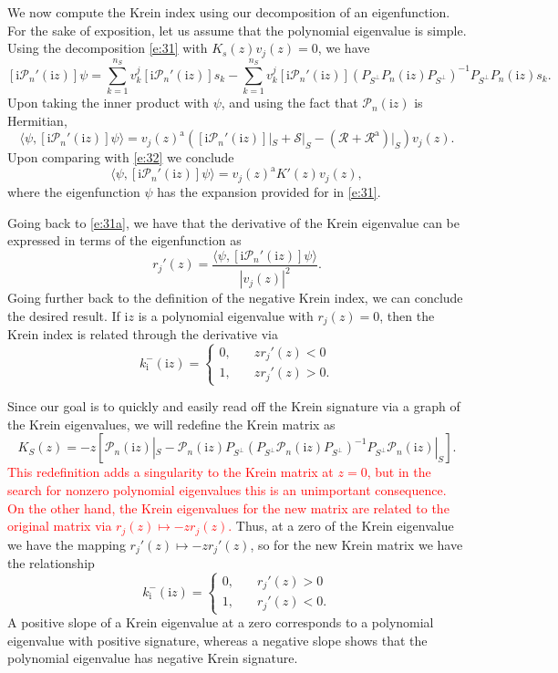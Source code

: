 \documentclass[review,onefignum,onetabnum]{siamart171218}
\newcommand{\rma}{\mathrm{a}}
\newcommand{\rmi}{\mathrm{i}}
\newcommand{\calP}{\mathcal{P}}
\newcommand{\calR}{\mathcal{R}}
\newcommand{\calS}{\mathcal{S}}
\newcommand{\vK}{\bm{\mathit{K}}}
\newcommand{\vv}{\bm{\mathit{v}}}
\newcommand{\vn}{\bm{\mathit{0}}}
\newcommand{\revised}[1]{ \textcolor{red}{#1} }
\begin{document}
We now compute the Krein index using our decomposition of an eigenfunction.
For the sake of exposition, let us assume that the polynomial eigenvalue is
simple. Using the decomposition \cref{e:31} with $\vK_s(z)\vv_j(z)=\vn$, we
have
\[
[\rmi\calP_n'(\rmi z)]\psi=\sum_{k=1}^{n_S}v_k^j[\rmi\calP_n'(\rmi z)]s_k-
\sum_{k=1}^{n_S}v_k^j[\rmi\calP_n'(\rmi z)]
\left(P_{S^\perp}P_n(\rmi z)P_{S^\perp}\right)^{-1}P_{S^\perp}P_n(\rmi z)s_k.
\]
Upon taking the inner product with $\psi$, and using the fact that
$\calP_n(\rmi z)$ is Hermitian,
\[
\langle\psi,[\rmi\calP_n'(\rmi z)]\psi\rangle=
\vv_j(z)^\rma\left([\rmi\calP_n'(\rmi z)]|_S+\calS|_S-(\calR+\calR^\rma)|_S\right)\vv_j(z).
\]
Upon comparing with \cref{e:32} we conclude
\[
\langle\psi,[\rmi\calP_n'(\rmi z)]\psi\rangle=\vv_j(z)^\rma\vK'(z)\vv_j(z),
\]
where the eigenfunction $\psi$ has the expansion provided for in \cref{e:31}.

Going back to \cref{e:31a}, we have that the derivative of the Krein
eigenvalue can be expressed in terms of the eigenfunction as
\[
r_j'(z)=\frac{\langle\psi,[\rmi\calP_n'(\rmi z)]\psi\rangle}{|\vv_j(z)|^2}.
\]
Going further back to the
definition of the negative Krein index, we can conclude the desired result.
If $\rmi z$ is a polynomial eigenvalue with $r_j(z)=0$, then the Krein index
is related through the derivative via
\[
k_\rmi^-(\rmi z)=\begin{cases}0,\quad&zr_j'(z)<0\\1,\quad&zr_j'(z)>0.\end{cases}
\]

Since our goal is to quickly and easily read off the Krein signature via a
graph of the Krein eigenvalues, we will redefine the Krein matrix as
\[
\vK_S(z)=-z\left[\calP_n(\rmi z)|_S-%
\calP_n(\rmi z)P_{S^\perp}(P_{S^\perp}\calP_n(\rmi z)P_{S^\perp})^{-1}P_{S^\perp}\calP_n(\rmi z)|_{S}\right].
\]
\revised{
This redefinition adds a singularity to the Krein matrix at $z=0$, but in the search for nonzero polynomial eigenvalues this is an unimportant consequence. On the other hand, the Krein eigenvalues for the new matrix are related to the original matrix
via $r_j(z)\mapsto -zr_j(z)$.
}
Thus, at a zero of the Krein eigenvalue we have
the mapping $r_j'(z)\mapsto -zr_j'(z)$, so for the new Krein matrix we have
the relationship
\[
k_\rmi^-(\rmi z)=\begin{cases}0,\quad&r_j'(z)>0\\1,\quad&r_j'(z)<0.\end{cases}
\]
A positive slope of a Krein eigenvalue at a zero corresponds to a polynomial
eigenvalue with positive signature, whereas a negative slope shows that the
polynomial eigenvalue has negative Krein signature.
\end{document}

